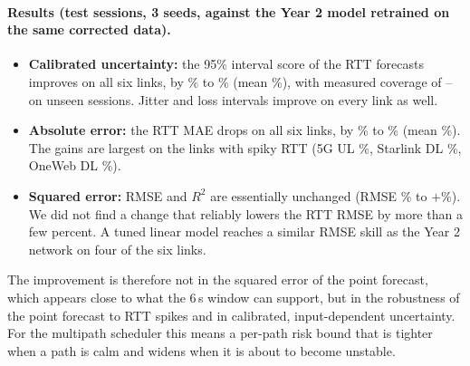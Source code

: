 \paragraph{Results (test sessions, 3 seeds, against the Year 2 model retrained on the same corrected data).}
\begin{itemize}[leftmargin=*]
  \item \textbf{Calibrated uncertainty:} the 95\% interval score of the RTT forecasts improves on all six links, by \ChgMISWorst\% to \ChgMISBest\% (mean \ChgMISMean\%), with measured coverage of \PICPMin--\PICPMax{} on unseen sessions. Jitter and loss intervals improve on every link as well.
  \item \textbf{Absolute error:} the RTT MAE drops on all six links, by \ChgMAEWorst\% to \ChgMAEBest\% (mean \ChgMAEMean\%). The gains are largest on the links with spiky RTT (5G UL \ChgMAEQUL\%, Starlink DL \ChgMAESLDL\%, OneWeb DL \ChgMAEOWDL\%).
  \item \textbf{Squared error:} RMSE and $R^2$ are essentially unchanged (RMSE \ChgRMSEBest\% to $+$\ChgRMSEWorst\%). We did not find a change that reliably lowers the RTT RMSE by more than a few percent. A tuned linear model reaches a similar RMSE skill as the Year 2 network on four of the six links.
\end{itemize}
The improvement is therefore not in the squared error of the point forecast, which appears close to what the 6\,s window can support, but in the robustness of the point forecast to RTT spikes and in calibrated, input-dependent uncertainty. For the multipath scheduler this means a per-path risk bound that is tighter when a path is calm and widens when it is about to become unstable.
